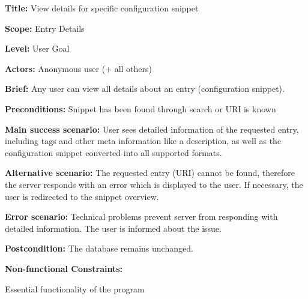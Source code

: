 
\begin{DoxyItemize}
\item {\bfseries{Title\+:}} View details for specific configuration snippet
\item {\bfseries{Scope\+:}} Entry Details
\item {\bfseries{Level\+:}} User Goal
\item {\bfseries{Actors\+:}} Anonymous user (+ all others)
\item {\bfseries{Brief\+:}} Any user can view all details about an entry (configuration snippet).
\end{DoxyItemize}


\begin{DoxyItemize}
\item {\bfseries{Preconditions\+:}} Snippet has been found through search or U\+RI is known
\item {\bfseries{Main success scenario\+:}} User sees detailed information of the requested entry, including tags and other meta information like a description, as well as the configuration snippet converted into all supported formats.
\item {\bfseries{Alternative scenario\+:}} The requested entry (U\+RI) cannot be found, therefore the server responds with an error which is displayed to the user. If necessary, the user is redirected to the snippet overview.
\item {\bfseries{Error scenario\+:}} Technical problems prevent server from responding with detailed information. The user is informed about the issue.
\item {\bfseries{Postcondition\+:}} The database remains unchanged.
\item {\bfseries{Non-\/functional Constraints\+:}}
\begin{DoxyItemize}
\item Essential functionality of the program 
\end{DoxyItemize}
\end{DoxyItemize}